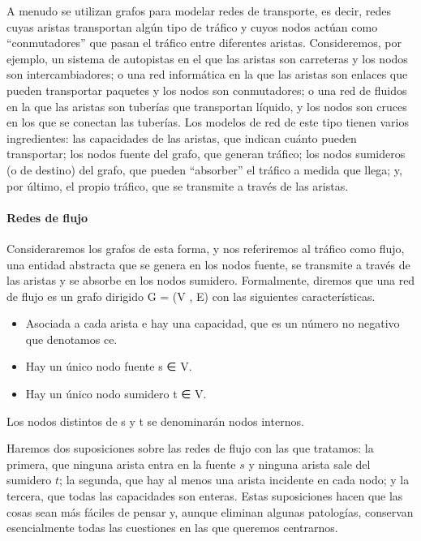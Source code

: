 \documentclass[a4paper, 12pt]{book}
\theoremstyle{dotless}
\begin{document}
A menudo se utilizan grafos para modelar redes de transporte, es decir, redes cuyas aristas transportan algún tipo de tráfico y cuyos nodos actúan como ``conmutadores'' que pasan el tráfico entre diferentes aristas. Consideremos, por ejemplo, un sistema de autopistas en el que las aristas son carreteras y los nodos son intercambiadores; o una red informática en la que las aristas son enlaces que pueden transportar paquetes y los nodos son conmutadores; o una red de fluidos en la que las aristas son tuberías que transportan líquido, y los nodos son cruces en los que se conectan las tuberías. Los modelos de red de este tipo tienen varios ingredientes: las capacidades de las aristas, que indican cuánto pueden transportar; los nodos fuente del grafo, que generan tráfico; los nodos sumideros (o de destino) del grafo, que pueden ``absorber'' el tráfico a medida que llega; y, por último, el propio tráfico, que se transmite a través de las aristas.

\paragraph{Redes de flujo} Consideraremos los grafos de esta forma, y nos referiremos al tráfico como flujo, una entidad abstracta que se genera en los nodos fuente, se transmite a través de las aristas y se absorbe en los nodos sumidero. Formalmente, diremos que una red de flujo es un grafo dirigido G = (V , E) con las siguientes características.

\begin{itemize}
    \item Asociada a cada arista e hay una capacidad, que es un número no negativo que denotamos ce.
    \item Hay un único nodo fuente s ∈ V.
    \item Hay un único nodo sumidero t ∈ V.
\end{itemize}

Los nodos distintos de s y t se denominarán nodos internos.

Haremos dos suposiciones sobre las redes de flujo con las que tratamos: la primera, que ninguna arista entra en la fuente $s$ y ninguna arista sale del sumidero $t$; la segunda, que hay al menos una arista incidente en cada nodo; y la tercera, que todas las capacidades son enteras. Estas suposiciones hacen que las cosas sean más fáciles de pensar y, aunque eliminan algunas patologías, conservan esencialmente todas las cuestiones en las que queremos centrarnos.
\end{document}
